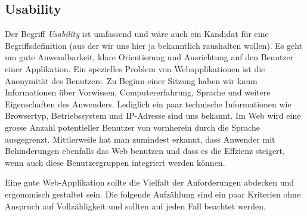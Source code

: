 \subsection{Usability}

Der Begriff \emph{Usability} ist umfassend und wäre auch ein Kandidat für eine
Begriffsdefinition (aus der wir uns hier ja bekanntlich raushalten wollen). Es
geht um gute Anwendbarkeit, klare Orientierung und Ausrichtung auf den Benutzer
einer Applikation. Ein spezielles Problem von Webapplikationen ist die Anonymität
des Benutzers. Zu Beginn einer Sitzung haben wir kaum Informationen über Vorwissen,
Computererfahrung, Sprache und weitere Eigenschaften des Anwenders. Lediglich ein
paar technische Informationen wie Browsertyp, Betriebssystem und IP-Adresse sind
uns bekannt. Im Web wird eine grosse Anzahl potentieller Benutzer von vornherein
durch die Sprache ausgegrenzt. Mittlerweile hat man zumindest erkannt, dass Anwender
mit Behinderungen ebenfalls das Web benutzen und dass es die Effzienz steigert,
wenn auch diese Benutzergruppen integriert werden können.

Eine gute Web-Applikation sollte die Vielfalt der Anforderungen abdecken und
ergonomisch gestaltet sein. Die folgende Aufzählung sind ein paar Kriterien
ohne Anspruch auf Vollzähligkeit und sollten auf jeden Fall beachtet werden.

